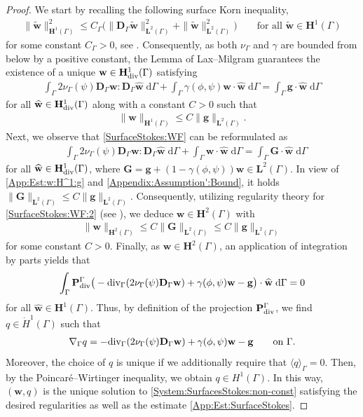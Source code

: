 \documentclass[10pt,reqno]{amsart}
\theoremstyle{remark}
\numberwithin{equation}{section}
\newcommand{\norm}[1]{\| #1 \|}
\newcommand{\meang}[1]{{\langle #1 \rangle}_{\Gamma}}
\newcommand{\bw}{\mathbf{w}}
\newcommand{\ww}{\widehat{\bw}}
\newcommand{\tw}{\widetilde{\bw}}
\newcommand{\g}{\mathbf{g}}
\newcommand{\G}{\mathbf{G}}
\newcommand{\Dg}{\mathbf{D}_\Gamma}
\newcommand{\intG}{\int_\Gamma}
\newcommand{\dG}{\;\mathrm d\Ga}
\newcommand{\Div}{\textnormal{div}}
\newcommand{\Gradg}{\nabla_\Ga}
\newcommand{\Divg}{\textnormal{div}_\Ga}
\newcommand{\Ga}{\Gamma}
\begin{document}
\begin{proof}
    We start by recalling the following surface Korn inequality,
    \begin{align*}
        \norm{\tw}_{\mathbf{H}^1(\Ga)}^2 \leq C_{\Ga} \big(\norm{\Dg\tw}_{\mathbf{L}^2(\Ga)}^2 + \norm{\tw}_{\mathbf{L}^2(\Ga)}^2\big) \qquad\text{for all~}\tw\in\mathbf{H}^1(\Ga)
    \end{align*}
    for some constant $C_{\Ga} > 0$, see \cite[Eqn.~(4.7)]{Jankuhn2018}. Consequently, as both $\nu_\Ga$ and $\gamma$ are bounded from below by a positive constant, the Lemma of Lax--Milgram guarantees the existence of a unique $\bw\in\mathbf{H}^1_\Div(\Ga)$ satisfying
    \begin{align}\label{SurfaceStokes:WF}
        \intG 2\nu_\Ga(\psi)\Dg\bw:\Dg\ww\dG + \intG \gamma(\phi,\psi)\bw\cdot\ww\dG = \intG \g\cdot\ww\dG
    \end{align}
    for all $\ww\in\mathbf{H}^1_\Div(\Ga)$ along with a constant $C > 0$ such that
    \begin{align}\label{App:Est:w:H^1:g}
        \norm{\bw}_{\mathbf{H}^1(\Ga)} \leq C\norm{\g}_{\mathbf{L}^2(\Ga)}.
    \end{align}
    Next, we observe that \eqref{SurfaceStokes:WF} can be reformulated as
    \begin{align}\label{SurfaceStokes:WF:2}
        &\intG 2\nu_\Ga(\psi)\Dg\bw:\Dg\ww\dG + \intG \bw\cdot\ww\dG = \intG \G\cdot\ww\dG
    \end{align}
    for all $\ww\in\mathbf{H}^1_\Div(\Ga)$, where $\G = \g + (1-\gamma(\phi,\psi))\bw\in\mathbf{L}^2(\Ga)$. In view of \eqref{App:Est:w:H^1:g} and \eqref{Appendix:Assumption':Bound}, it holds $\norm{\G}_{\mathbf{L}^2(\Ga)} \leq C\norm{\g}_{\mathbf{L}^2(\Ga)}$. Consequently, utilizing regularity theory for \eqref{SurfaceStokes:WF:2} (see \cite[Lemma~7.4]{Abels2024}), we deduce $\bw\in\mathbf{H}^2(\Ga)$ with
    \begin{align*}
        \norm{\bw}_{\mathbf{H}^2(\Ga)} \leq C\norm{\G}_{\mathbf{L}^2(\Ga)} \leq C\norm{\g}_{\mathbf{L}^2(\Ga)}
    \end{align*}
    for some constant $C > 0$. Finally, as $\bw\in\mathbf{H}^2(\Ga)$, an application of integration by parts yields that
    \begin{align*}
        \intG \mathbf{P}_\Div^\Ga\big(-\Divg(2\nu_\Ga(\psi)\Dg\bw) + \gamma(\phi,\psi)\bw - \g\big)\cdot\ww\dG = 0
    \end{align*}
    for all $\ww\in\mathbf{H}^1(\Ga)$. Thus, by definition of the projection $\mathbf{P}_\Div^\Ga$, we find $q\in \dot{H}^1(\Ga)$ such that
    \begin{align}\label{Pressure:q:Construct}
        \Gradg q = -\Divg(2\nu_\Ga(\psi)\Dg\bw) + \gamma(\phi,\psi)\bw - \g \qquad\text{on~}\Ga.
    \end{align}
    Moreover, the choice of $q$ is unique if we additionally require that $\meang{q} = 0$. Then, by the Poincar\'{e}--Wirtinger inequality, we obtain $q\in H^1(\Ga)$. In this way, $(\bw,q)$ is the unique solution to \eqref{System:SurfacesStokes:non-const} satisfying the desired regularities as well as the estimate \eqref{App:Est:SurfaceStokes}.
\end{proof}
\end{document}
